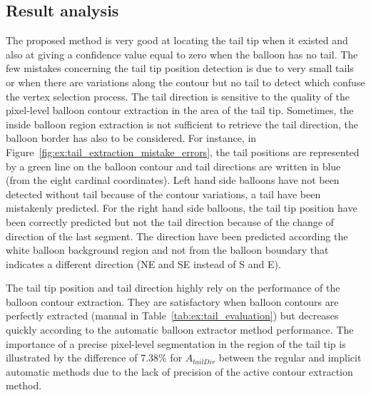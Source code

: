
\subsection{Result analysis} %
\label{sub:ex:result_analysis_tail_evaluation}


The proposed method is very good at locating the tail tip when it existed and also at giving a confidence value equal to zero when the balloon has no tail.
The few mistakes concerning the tail tip position detection is due to very small tails or when there are variations along the contour but no tail to detect which confuse the vertex selection process.
The tail direction is sensitive to the quality of the pixel-level balloon contour extraction in the area of the tail tip.
Sometimes, the inside balloon region extraction is not sufficient to retrieve the tail direction, the balloon border has also to be considered.
For instance, in Figure~\ref{fig:ex:tail_extraction_mistake_errors}, the tail positions are represented by a green line on the balloon contour and tail directions are written in blue (from the eight cardinal coordinates).
Left hand side balloons have not been detected without tail because of the contour variations, a tail have been mistakenly predicted.
For the right hand side balloons, the tail tip position have been correctly predicted but not the tail direction because of the change of direction of the last segment.
The direction have been predicted according the white balloon background region and not from the balloon boundary that indicates a different direction (NE and SE instead of S and E).

The tail tip position and tail direction highly rely on the performance of the balloon contour extraction.
They are satisfactory when balloon contours are perfectly extracted (manual in Table~\ref{tab:ex:tail_evaluation}) but decreases quickly according to the automatic balloon extractor method performance.
The importance of a precise pixel-level segmentation in the region of the tail tip is illustrated by the difference of 7.38\% for $A_{tailDir}$ between the regular and implicit automatic methods due to the lack of precision of the active contour extraction method.



